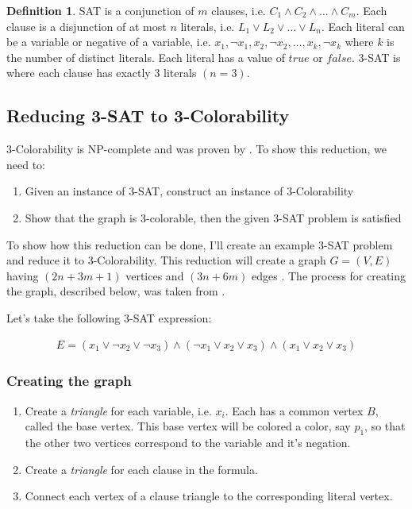 \documentclass{article}
\theoremstyle{definition}
\newtheorem*{definition}{Definition}
\begin{document}
\begin{definition}
SAT is a conjunction of $m$ clauses, i.e. $C_1 \wedge C_2 \wedge \dots \wedge C_m$. Each clause is a disjunction of at most $n$ literals, i.e. $L_1 \vee L_2 \vee \dots \vee L_n$. Each literal can be a variable or negative of a variable, i.e. $x_1, \neg x_1, x_2, \neg x_2, \dots , x_k, \neg x_k$ where $k$ is the number of distinct literals. Each literal has a value of $true$ or $false$. 3-SAT is where each clause has exactly 3 literals \((n = 3)\).
\end{definition}

\subsection*{Reducing 3-SAT to 3-Colorability}
3-Colorability is NP-complete and was proven by \cite{moret}. To show this reduction, we need to:

\begin{enumerate}
\item Given an instance of 3-SAT, construct an instance of 3-Colorability
\item Show that the graph is 3-colorable, then the given 3-SAT problem is satisfied
\end{enumerate}

To show how this reduction can be done, I'll create an example 3-SAT problem and reduce it to 3-Colorability. This reduction will create a graph \(G = (V, E)\) having \((2n + 3m + 1)\) vertices and \((3n+6m)\) edges \cite{moret}. The process for creating the graph, described below, was taken from \cite{sharma}.\newline

Let's take the following 3-SAT expression:

\begin{align*}
E = \left( x_1 \vee \neg x_2 \vee \neg x_3 \right) \wedge \left( \neg x_1 \vee x_2 \vee x_3 \right) \wedge \left( x_1 \vee x_2 \vee x_3 \right)
\end{align*}

\subsubsection*{Creating the graph}
\begin{enumerate}
\item Create a \emph{triangle} for each variable, i.e. \(x_i\). Each has a common vertex \(B\), called the base vertex. This base vertex will be colored a color, say \(p_1\), so that the other two vertices correspond to the variable and it's negation. 
\item Create a \emph{triangle} for each clause in the formula. 
\item Connect each vertex of a clause triangle to the corresponding literal vertex.
\end{enumerate}
\end{document}
